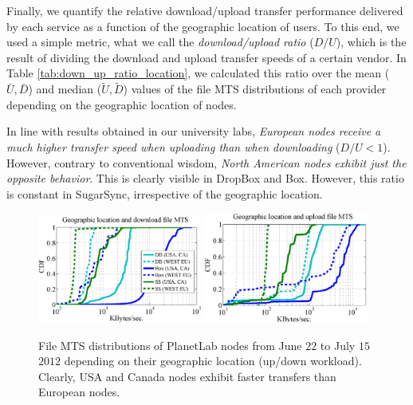 Finally, we quantify the relative download/upload transfer performance delivered by 
each service as a function of the geographic location of users.
To this end,
we used a simple metric, what we call the \textit{download/upload ratio} ($D/U$), which
is the result of dividing the download and upload transfer speeds of a certain vendor.   
In Table \ref{tab:down_up_ratio_location}, we calculated this ratio over the mean ($\bar{U},\bar{D}$) 
and median ($\tilde{U},\tilde{D}$) values of the file MTS distributions of each
provider depending on the geographic location of nodes. 

In line with results obtained in our university labs, 
\textit{European nodes receive a much higher 
transfer speed when uploading than when downloading} ($D/U<1$). 
However, contrary to conventional wisdom, \textit{North American nodes exhibit 
just the opposite behavior}. This is clearly visible in DropBox and Box. However, this ratio is constant
in SugarSync, irrespective of the geographic location.



\begin{figure}[h]
\centering	
{\label{fig:transfer_times_geographic_location_downloads}
\includegraphics[width=0.48\textwidth]{figures/geographic_location_downloads.eps}} 
{\label{fig:transfer_times_geographic_location_uploads}
\includegraphics[width=0.48\textwidth]{figures/geographic_location_uploads.eps}}
	\caption{File MTS distributions of PlanetLab nodes from June $22$ to July $15$ 
	$2012$ depending on their geographic location (up/down workload).
	Clearly, USA and Canada nodes exhibit faster transfers than European nodes.}
	\label{fig:transfer_times_geographic_location}
\end{figure}


